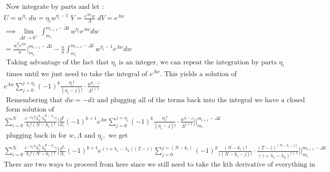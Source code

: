 \documentclass{article}
\begin{document}
\begin{align}
& \text{  Now integrate by parts and let : } \nonumber \\
& U=w^{\eta_i} \; du = \eta_i w^{\eta_i-1} \; V =\frac{e^{\Lambda w}w}{\Lambda} \; dV = e^{\Lambda w} \nonumber \\
& \implies \lim_{\Delta t \to 0^+} \int_{m_i}^{m_{i+1}-\Delta t}   w^{\eta_i}e^{\Lambda w}dw  \nonumber \\
&  = \frac{w^\eta_i e^{\Lambda w}}{a}\Big|_{m_i}^{m_{i+1}-\Delta t}  - \frac{n}{a} \int_{m_i}^{m_{i+1}-\Delta t}   w^{\eta_i-1}e^{\Lambda w}dw \nonumber \\
& \text{  Taking advantage of the fact that } \eta_i \text{ is an integer, we can repeat the  integration by parts } \eta_i \nonumber \\ 
& \text{ times until we just need to take the integral of } e^{\Lambda w}. \text{    This yields a solution of } \\ \nonumber 
& e^{\Lambda w}\sum_{j=0}^{j=\eta_i}(-1)^k \frac{\eta_i !}{(\eta_i - j)!}\cdot \frac{w^{\eta_i-j}}{\Lambda^{j+1}} \nonumber \\
& \text{  Remembering that } dw = -d\bar{z} \text{ and plugging all of the terms back into the integral we have a closed} \nonumber \\
& \text{ form solution of } \nonumber \\
& \sum_{i=0}^N \frac{e^{-\lambda_2 T}\lambda_1^{k_i}\lambda_2^{N-k_i} \gamma}{k_i!(N-k_i)!}
                 \big[\frac{\partial^k}{\partial_{\gamma}}(-1)^{k+1}
                 e^{\Lambda w}\sum_{j=0}^{j=\eta_i}(-1)^k \frac{\eta_i !}{(\eta_i - j)!}\cdot \frac{w^{\eta_i-j}}{\Lambda^{j+1}}\big]
                 \Big|_{m_i}^{m_{i+1}-\Delta t} \nonumber \\
& \text{ plugging back in for } w, \Lambda \text{ and } \eta_i, \text{ we get} \nonumber \\
& \sum_{i=0}^N \frac{e^{-\lambda_2 T}\lambda_1^{k_i}\lambda_2^{N-k_i} \gamma}{k_i!(N-k_i)!}
                 \Big[\frac{\partial^{k_i}}{\partial_{\gamma}}(-1)^{k+1}
                 e^{(\gamma + \lambda_1 - \lambda_2) (T - \bar{z})}\sum_{j=0}^{j=(N-k_i)}(-1)^k \frac{(N-k_i) !}{((N-k_i - j)!}\cdot 
                 \frac{(T - \bar{z})^{(N-k_i-j)}}{(\gamma + \lambda_1 - \lambda_2)^{j+1}}\Big]
                 \Big|_{m_i}^{m_{i+1}-\Delta t} \nonumber \\
& \text{There are two ways to proceed from here since we still need to take the kth derivative of everything in brackets} \nonumber \\

\end{align}
\end{document}
